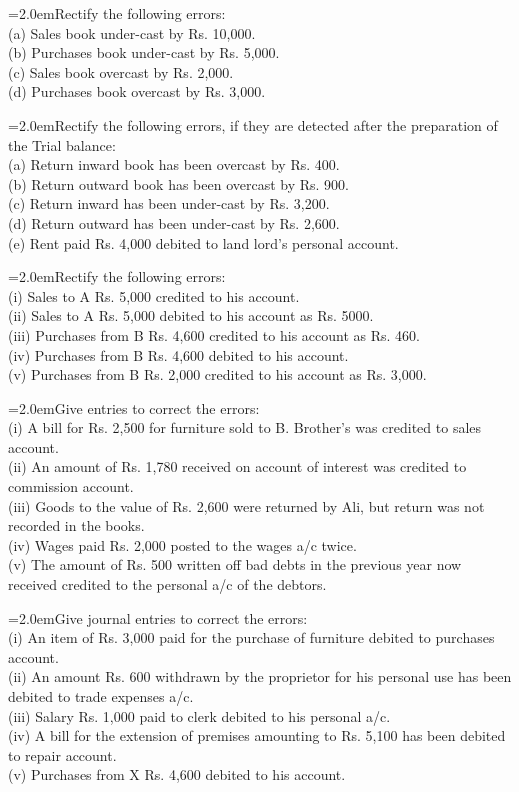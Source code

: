 \documentclass[11pt,a4paper]{article}
\newcommand{\lqn}[2]{\Needspace{6\baselineskip}\par\medskip\noindent\hangindent=2.0em\hangafter=1\makebox[2.0em][l]{\textbf{#1.}}#2\par}
\begin{document}
\lqn{136}{Rectify the following errors:\\
(a) Sales book under-cast by Rs. 10,000.\\
(b) Purchases book under-cast by Rs. 5,000.\\
(c) Sales book overcast by Rs. 2,000.\\
(d) Purchases book overcast by Rs. 3,000.\par
}
\lqn{137}{Rectify the following errors, if they are detected after the preparation of the Trial balance:\\
(a) Return inward book has been overcast by Rs. 400.\\
(b) Return outward book has been overcast by Rs. 900.\\
(c) Return inward has been under-cast by Rs. 3,200.\\
(d) Return outward has been under-cast by Rs. 2,600.\\
(e) Rent paid Rs. 4,000 debited to land lord’s personal account.\par
}
\lqn{138}{Rectify the following errors:\\
(i) Sales to A Rs. 5,000 credited to his account.\\
(ii) Sales to A Rs. 5,000 debited to his account as Rs. 5000.\\
(iii) Purchases from B Rs. 4,600 credited to his account as Rs. 460.\\
(iv) Purchases from B Rs. 4,600 debited to his account.\\
(v) Purchases from B Rs. 2,000 credited to his account as Rs. 3,000.\par
}
\lqn{139}{Give entries to correct the errors:\\
(i) A bill for Rs. 2,500 for furniture sold to B. Brother’s was credited to sales account.\\
(ii) An amount of Rs. 1,780 received on account of interest was credited to commission account.\\
(iii) Goods to the value of Rs. 2,600 were returned by Ali, but return was not recorded in the books.\\
(iv) Wages paid Rs. 2,000 posted to the wages a/c twice.\\
(v) The amount of Rs. 500 written off bad debts in the previous year now received credited to the personal a/c of the debtors.\par
}
\lqn{140}{Give journal entries to correct the errors:\\
(i) An item of Rs. 3,000 paid for the purchase of furniture debited to purchases account.\\
(ii) An amount Rs. 600 withdrawn by the proprietor for his personal use has been debited to trade expenses a/c.\\
(iii) Salary Rs. 1,000 paid to clerk debited to his personal a/c.\\
(iv) A bill for the extension of premises amounting to Rs. 5,100 has been debited to repair account.\\
(v) Purchases from X Rs. 4,600 debited to his account.\par
}
\end{document}

